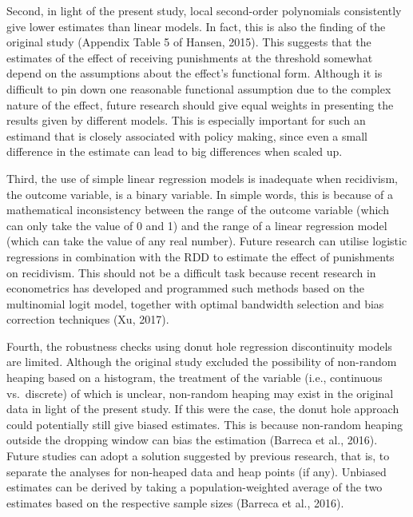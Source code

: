 \documentclass[
  11pt,
]{article}
\begin{document}
Second, in light of the present study, local second-order polynomials
consistently give lower estimates than linear models. In fact, this is
also the finding of the original study (Appendix Table 5 of Hansen,
2015). This suggests that the estimates of the effect of receiving
punishments at the threshold somewhat depend on the assumptions about
the effect's functional form. Although it is difficult to pin down one
reasonable functional assumption due to the complex nature of the
effect, future research should give equal weights in presenting the
results given by different models. This is especially important for such
an estimand that is closely associated with policy making, since even a
small difference in the estimate can lead to big differences when scaled
up.

Third, the use of simple linear regression models is inadequate when
recidivism, the outcome variable, is a binary variable. In simple words,
this is because of a mathematical inconsistency between the range of the
outcome variable (which can only take the value of 0 and 1) and the
range of a linear regression model (which can take the value of any real
number). Future research can utilise logistic regressions in combination
with the RDD to estimate the effect of punishments on recidivism. This
should not be a difficult task because recent research in econometrics
has developed and programmed such methods based on the multinomial logit
model, together with optimal bandwidth selection and bias correction
techniques (Xu, 2017).

Fourth, the robustness checks using donut hole regression discontinuity
models are limited. Although the original study excluded the possibility
of non-random heaping based on a histogram, the treatment of the
variable (i.e., continuous vs.~discrete) of which is unclear, non-random
heaping may exist in the original data in light of the present study. If
this were the case, the donut hole approach could potentially still give
biased estimates. This is because non-random heaping outside the
dropping window can bias the estimation (Barreca et al., 2016). Future
studies can adopt a solution suggested by previous research, that is, to
separate the analyses for non-heaped data and heap points (if any).
Unbiased estimates can be derived by taking a population-weighted
average of the two estimates based on the respective sample sizes
(Barreca et al., 2016).
\end{document}
